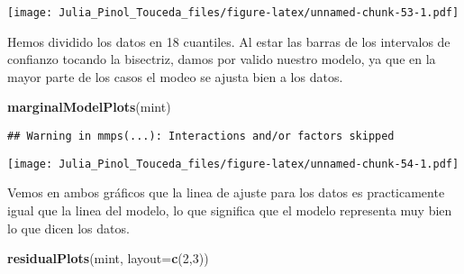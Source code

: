 \documentclass[]{article}
\newenvironment{Shaded}{\begin{snugshade}}{\end{snugshade}}
\newcommand{\KeywordTok}[1]{\textcolor[rgb]{0.13,0.29,0.53}{\textbf{#1}}}
\newcommand{\DataTypeTok}[1]{\textcolor[rgb]{0.13,0.29,0.53}{#1}}
\newcommand{\DecValTok}[1]{\textcolor[rgb]{0.00,0.00,0.81}{#1}}
\newcommand{\FloatTok}[1]{\textcolor[rgb]{0.00,0.00,0.81}{#1}}
\newcommand{\StringTok}[1]{\textcolor[rgb]{0.31,0.60,0.02}{#1}}
\newcommand{\ControlFlowTok}[1]{\textcolor[rgb]{0.13,0.29,0.53}{\textbf{#1}}}
\newcommand{\OperatorTok}[1]{\textcolor[rgb]{0.81,0.36,0.00}{\textbf{#1}}}
\newcommand{\NormalTok}[1]{#1}
\begin{document}
\begin{Shaded}
\end{Shaded}

\texttt{[image: Julia\_Pinol\_Touceda\_files/figure-latex/unnamed-chunk-53-1.pdf]}

Hemos dividido los datos en 18 cuantiles. Al estar las barras de los
intervalos de confianzo tocando la bisectriz, damos por valido nuestro
modelo, ya que en la mayor parte de los casos el modeo se ajusta bien a
los datos.

\begin{Shaded}
\begin{Highlighting}[]
\KeywordTok{marginalModelPlots}\NormalTok{(mint) }
\end{Highlighting}
\end{Shaded}

\begin{verbatim}
## Warning in mmps(...): Interactions and/or factors skipped
\end{verbatim}

\texttt{[image: Julia\_Pinol\_Touceda\_files/figure-latex/unnamed-chunk-54-1.pdf]}

Vemos en ambos gráficos que la linea de ajuste para los datos es
practicamente igual que la linea del modelo, lo que significa que el
modelo representa muy bien lo que dicen los datos.

\begin{Shaded}
\begin{Highlighting}[]
\KeywordTok{residualPlots}\NormalTok{(mint, }\DataTypeTok{layout=}\KeywordTok{c}\NormalTok{(}\DecValTok{2}\NormalTok{,}\DecValTok{3}\NormalTok{))}
\end{Highlighting}
\end{Shaded}
\end{document}
